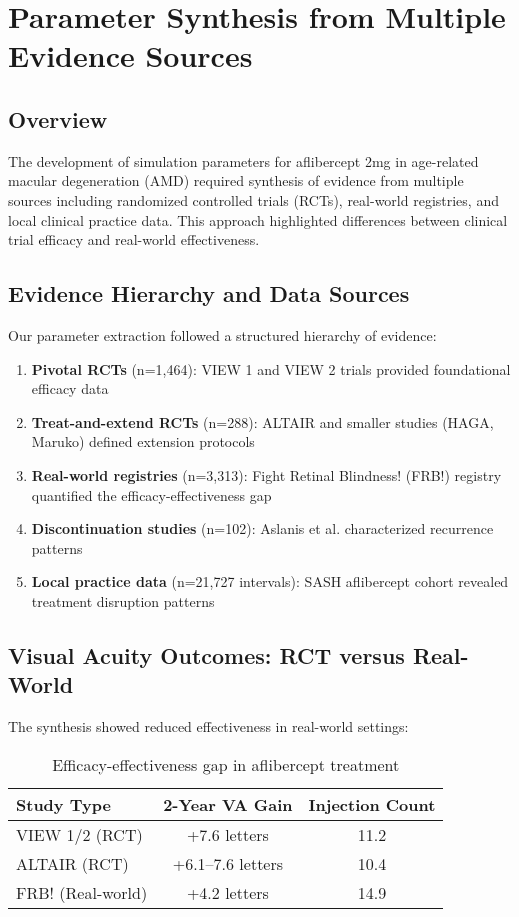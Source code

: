 \section{Parameter Synthesis from Multiple Evidence Sources}

\subsection{Overview}

The development of simulation parameters for aflibercept 2mg in age-related macular degeneration (AMD) required synthesis of evidence from multiple sources including randomized controlled trials (RCTs), real-world registries, and local clinical practice data. This approach highlighted differences between clinical trial efficacy and real-world effectiveness.

\subsection{Evidence Hierarchy and Data Sources}

Our parameter extraction followed a structured hierarchy of evidence:

\begin{enumerate}
    \item \textbf{Pivotal RCTs} (n=1,464): VIEW 1 and VIEW 2 trials provided foundational efficacy data
    \item \textbf{Treat-and-extend RCTs} (n=288): ALTAIR and smaller studies (HAGA, Maruko) defined extension protocols
    \item \textbf{Real-world registries} (n=3,313): Fight Retinal Blindness! (FRB!) registry quantified the efficacy-effectiveness gap
    \item \textbf{Discontinuation studies} (n=102): Aslanis et al. characterized recurrence patterns
    \item \textbf{Local practice data} (n=21,727 intervals): SASH aflibercept cohort revealed treatment disruption patterns
\end{enumerate}

\subsection{Visual Acuity Outcomes: RCT versus Real-World}

The synthesis showed reduced effectiveness in real-world settings:

\begin{table}[h]
\centering
\begin{tabular}{lcc}
\hline
\textbf{Study Type} & \textbf{2-Year VA Gain} & \textbf{Injection Count} \\
\hline
VIEW 1/2 (RCT) & +7.6 letters & 11.2 \\
ALTAIR (RCT) & +6.1--7.6 letters & 10.4 \\
FRB! (Real-world) & +4.2 letters & 14.9 \\
\hline
\end{tabular}
\caption{Efficacy-effectiveness gap in aflibercept treatment}
\end{table}

